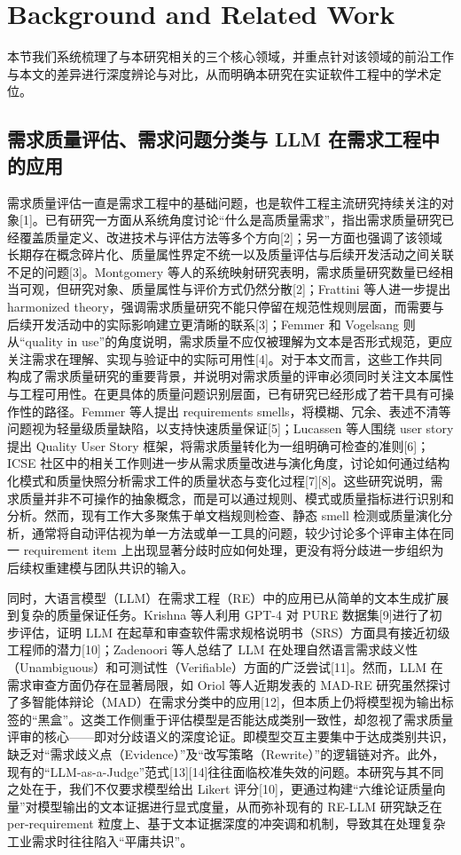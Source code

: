 \documentclass[a4paper,11pt]{ctexart}
\begin{document}
\section{Background and Related Work}
\label{sec:related}
本节我们系统梳理了与本研究相关的三个核心领域，并重点针对该领域的前沿工作与本文的差异进行深度辨论与对比，从而明确本研究在实证软件工程中的学术定位。

\subsection{需求质量评估、需求问题分类与 LLM 在需求工程中的应用}
需求质量评估一直是需求工程中的基础问题，也是软件工程主流研究持续关注的对象[1]。已有研究一方面从系统角度讨论“什么是高质量需求”，指出需求质量研究已经覆盖质量定义、改进技术与评估方法等多个方向[2]；另一方面也强调了该领域长期存在概念碎片化、质量属性界定不统一以及质量评估与后续开发活动之间关联不足的问题[3]。Montgomery 等人的系统映射研究表明，需求质量研究数量已经相当可观，但研究对象、质量属性与评价方式仍然分散[2]；Frattini 等人进一步提出 harmonized theory，强调需求质量研究不能只停留在规范性规则层面，而需要与后续开发活动中的实际影响建立更清晰的联系[3]；Femmer 和 Vogelsang 则从“quality in use”的角度说明，需求质量不应仅被理解为文本是否形式规范，更应关注需求在理解、实现与验证中的实际可用性[4]。对于本文而言，这些工作共同构成了需求质量研究的重要背景，并说明对需求质量的评审必须同时关注文本属性与工程可用性。在更具体的质量问题识别层面，已有研究已经形成了若干具有可操作性的路径。Femmer 等人提出 requirements smells，将模糊、冗余、表述不清等问题视为轻量级质量缺陷，以支持快速质量保证[5]；Lucassen 等人围绕 user story 提出 Quality User Story 框架，将需求质量转化为一组明确可检查的准则[6]；ICSE 社区中的相关工作则进一步从需求质量改进与演化角度，讨论如何通过结构化模式和质量快照分析需求工件的质量状态与变化过程[7][8]。这些研究说明，需求质量并非不可操作的抽象概念，而是可以通过规则、模式或质量指标进行识别和分析。然而，现有工作大多聚焦于单文档规则检查、静态 smell 检测或质量演化分析，通常将自动评估视为单一方法或单一工具的问题，较少讨论多个评审主体在同一 requirement item 上出现显著分歧时应如何处理，更没有将分歧进一步组织为后续权重建模与团队共识的输入。

同时，大语言模型（LLM）在需求工程（RE）中的应用已从简单的文本生成扩展到复杂的质量保证任务。Krishna 等人利用 GPT-4 对 PURE 数据集[9]进行了初步评估，证明 LLM 在起草和审查软件需求规格说明书（SRS）方面具有接近初级工程师的潜力[10]；Zadenoori 等人总结了 LLM 在处理自然语言需求歧义性（Unambiguous）和可测试性（Verifiable）方面的广泛尝试[11]。然而，LLM 在需求审查方面仍存在显著局限，如 Oriol 等人近期发表的 MAD-RE 研究虽然探讨了多智能体辩论（MAD）在需求分类中的应用[12]，但本质上仍将模型视为输出标签的“黑盒”。这类工作侧重于评估模型是否能达成类别一致性，却忽视了需求质量评审的核心——即对分歧语义的深度论证。即模型交互主要集中于达成类别共识，缺乏对“需求歧义点（Evidence）”及“改写策略（Rewrite）”的逻辑链对齐。此外，现有的“LLM-as-a-Judge”范式[13][14]往往面临校准失效的问题。本研究与其不同之处在于，我们不仅要求模型给出 Likert 评分[10]，更通过构建“六维论证质量向量”对模型输出的文本证据进行显式度量，从而弥补现有的 RE-LLM 研究缺乏在 per-requirement 粒度上、基于文本证据深度的冲突调和机制，导致其在处理复杂工业需求时往往陷入“平庸共识”。
\end{document}
